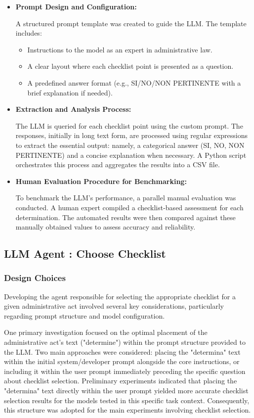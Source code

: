 \documentclass[../main.tex]{subfiles}
\begin{document}
\begin{itemize}
    \item \textbf{Prompt Design and Configuration:}
    
 A structured prompt template was created to guide the LLM. The template includes:
    \begin{itemize}
        \item Instructions to the model as an expert in administrative law.
        \item A clear layout where each checklist point is presented as a question.
        \item A predefined answer format (e.g., SI/NO/NON PERTINENTE with a brief explanation if needed).
    \end{itemize}
    \item \textbf{Extraction and Analysis Process:}
    
 The LLM is queried for each checklist point using the custom prompt. The responses, initially in long text form, are processed using regular expressions to extract the essential output: namely, a categorical answer (SI, NO, NON PERTINENTE) and a concise explanation when necessary. A Python script orchestrates this process and aggregates the results into a CSV file.
    \item \textbf{Human Evaluation Procedure for Benchmarking:}
    
 To benchmark the LLM's performance, a parallel manual evaluation was conducted. A human expert compiled a checklist-based assessment for each determination. The automated results were then compared against these manually obtained values to assess accuracy and reliability.
\end{itemize}

\subsection{LLM Agent : Choose Checklist}

\subsubsection{Design Choices}
\label{subsubsec:choose_designchoices}

Developing the agent responsible for selecting the appropriate checklist for a given administrative act involved several key considerations, particularly regarding prompt structure and model configuration.

One primary investigation focused on the optimal placement of the administrative act's text ("determine") within the prompt structure provided to the LLM. Two main approaches were considered: placing the "determina" text within the initial system/developer prompt alongside the core instructions, or including it within the user prompt immediately preceding the specific question about checklist selection. Preliminary experiments indicated that placing the "determina" text directly within the user prompt yielded more accurate checklist selection results for the models tested in this specific task context. Consequently, this structure was adopted for the main experiments involving checklist selection.
\end{document}

